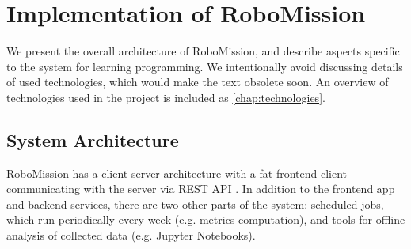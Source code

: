 \chapter{Implementation of RoboMission}
\label{chap:implementation-of-robomission}



We present the overall architecture of RoboMission,
and describe aspects specific to the system for learning programming.
We intentionally avoid discussing details of used technologies,
which would make the text obsolete soon.
An overview of technologies used in the project is included as \cref{chap:technologies}.

\section{System Architecture}

RoboMission has a client-server architecture
with a fat frontend client communicating with the server via REST API
\cite{rest-api}.
In addition to the frontend app and backend services,
there are two other parts of the system:
scheduled jobs, which run periodically every week (e.g. metrics computation),
and tools for offline analysis of collected data
(e.g. Jupyter Notebooks). %

